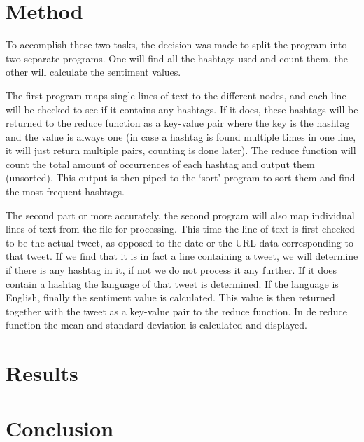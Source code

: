 \documentclass[a4paper,12px]{article}
\begin{document}
\section{Method}

To accomplish these two tasks, the decision was made to split the program into
two separate programs. One will find all the hashtags used and count them, the
other will calculate the sentiment values.

The first program maps single lines of text to the different nodes, and each
line will be checked to see if it contains any hashtags. If it does, these
hashtags will be returned to the reduce function as a key-value pair where the
key is the hashtag and the value is always one (in case a hashtag is found
multiple times in one line, it will just return multiple pairs, counting is done
later). The reduce function will count the total amount of occurrences of each
hashtag and output them (unsorted). This output is then piped to the `sort'
program to sort them and find the most frequent hashtags.

The second part or more accurately, the second program will also map individual
lines of text from the file for processing. This time the line of text is first
checked to be the actual tweet, as opposed to the date or the URL data
corresponding to that tweet. If we find that it is in fact a line containing a
tweet, we will determine if there is any hashtag in it, if not we do not process
it any further. If it does contain a hashtag the language of that tweet is
determined. If the language is English, finally the sentiment value is
calculated. This value is then returned together with the tweet as a key-value
pair to the reduce function. In de reduce function the mean and standard
deviation is calculated and displayed.


\section{Results}


\section{Conclusion}



%
%
\end{document}
